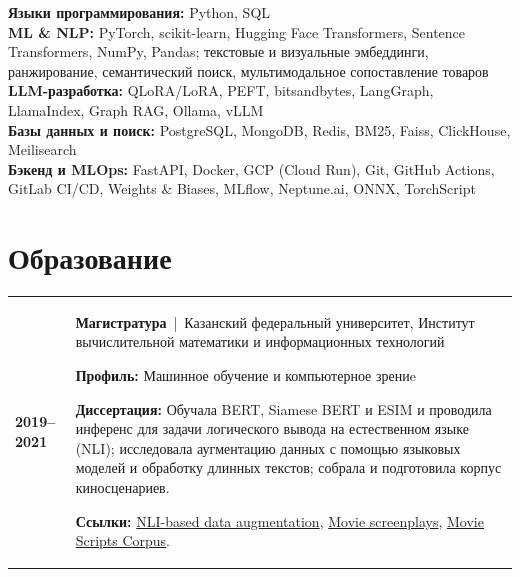 \documentclass[12pt]{article}
\begin{document}
{\RaggedRight
\textbf{Языки программирования:} Python, SQL\\[3pt]
\textbf{ML \& NLP:} PyTorch, scikit-learn, Hugging Face Transformers, Sentence Transformers, NumPy, Pandas; текстовые и визуальные эмбеддинги, ранжирование, семантический поиск, мультимодальное сопоставление товаров\\[3pt]
\textbf{LLM-разработка:} QLoRA/LoRA, PEFT, bitsandbytes, LangGraph, LlamaIndex, Graph RAG, Ollama, vLLM\\[3pt]
\textbf{Базы данных и поиск:} PostgreSQL, MongoDB, Redis, BM25, Faiss, ClickHouse, Meilisearch\\[3pt]
\textbf{Бэкенд и MLOps:} FastAPI, Docker, GCP (Cloud Run), Git, GitHub Actions, GitLab CI/CD, Weights \& Biases, MLflow, Neptune.ai, ONNX, TorchScript
\par}
\vspace{3pt}

\section*{Образование}
\vspace{3pt}

\begin{tabularx}{\textwidth}{@{}l >{\RaggedRight\arraybackslash}X@{}}
\textbf{2019--2021} &

\textbf{Магистратура} \,|\, Казанский федеральный университет, Институт вычислительной математики и информационных технологий
\par\vspace{3pt}
\textbf{Профиль:} Машинное обучение и компьютерное зрениe\par\vspace{1pt}
\textbf{Диссертация:} Обучала BERT, Siamese BERT и ESIM и проводила инференс для задачи логического вывода на естественном языке (NLI); исследовала аугментацию данных с помощью языковых моделей и обработку длинных текстов; собрала и подготовила корпус киносценариев.
\par\vspace{1pt}
\textbf{Ссылки:}
\href{https://github.com/KseniaGu/NLI-based-augmentation}{\textcolor{blue!65!black}{NLI-based data augmentation}},
\href{https://github.com/KseniaGu/movie-screenplays/tree/main}{\textcolor{blue!65!black}{Movie screenplays}},
\href{https://www.kaggle.com/datasets/gufukuro/movie-scripts-corpus}{\textcolor{blue!65!black}{Movie Scripts Corpus}}.
\end{tabularx}
\end{document}
